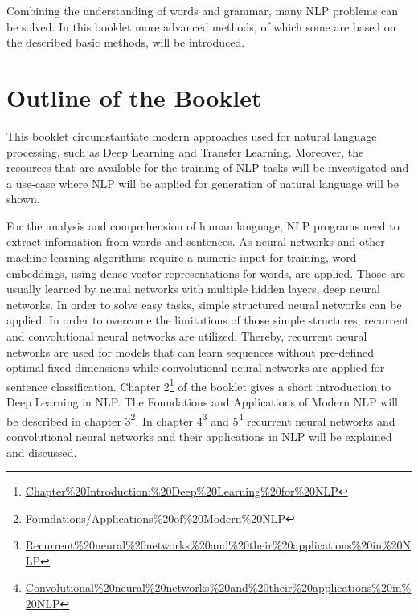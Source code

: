 \documentclass[]{krantz}
\renewcommand{\href}[2]{#2\footnote{\url{#1}}}
\begin{document}
Combining the understanding of words and grammar, many NLP problems can be solved. In this booklet more advanced methods, of which some are based on the described basic methods, will be introduced.

\hypertarget{outline-of-the-booklet}{%
\section{Outline of the Booklet}\label{outline-of-the-booklet}}

This booklet circumstantiate modern approaches used for natural language processing, such as Deep Learning and Transfer Learning. Moreover, the resources that are available for the training of NLP tasks will be investigated and a use-case where NLP will be applied for generation of natural language will be shown.

For the analysis and comprehension of human language, NLP programs need to extract information from words and sentences. As neural networks and other machine learning algorithms require a numeric input for training, word embeddings, using dense vector representations for words, are applied. Those are usually learned by neural networks with multiple hidden layers, deep neural networks. In order to solve easy tasks, simple structured neural networks can be applied. In order to overcome the limitations of those simple structures, recurrent and convolutional neural networks are utilized. Thereby, recurrent neural networks are used for models that can learn sequences without pre-defined optimal fixed dimensions while convolutional neural networks are applied for sentence classification.
Chapter \href{Chapter\%20Introduction:\%20Deep\%20Learning\%20for\%20NLP}{2} of the booklet gives a short introduction to Deep Learning in NLP. The Foundations and Applications of Modern NLP will be described in chapter \href{Foundations/Applications\%20of\%20Modern\%20NLP}{3}. In chapter \href{Recurrent\%20neural\%20networks\%20and\%20their\%20applications\%20in\%20NLP}{4} and \href{Convolutional\%20neural\%20networks\%20and\%20their\%20applications\%20in\%20NLP}{5} recurrent neural networks and convolutional neural networks and their applications in NLP will be explained and discussed.
\end{document}
